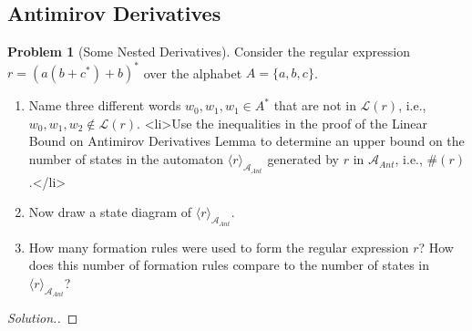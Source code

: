 \documentclass[11pt]{article}
\theoremstyle{theorem} %
\theoremstyle{definition} %
\newtheorem{problem}                    {{\color{BurntOrange}Problem}}
\theoremstyle{remark} %
\begin{document}
\subsection*{Antimirov Derivatives}

\begin{problem}
    [Some Nested Derivatives]
    Consider the regular expression \(r = (a(b+c^*) + b)^*\) over the alphabet \(A = \{a,b,c\}\).
    \begin{enumerate}
        \item Name three different words \(w_0,w_1,w_1 \in A^*\) that are not in \(\mathcal L(r)\), i.e., \(w_0,w_1,w_2 \notin \mathcal L(r)\).
        <li>Use the inequalities in the proof of the Linear Bound on Antimirov Derivatives Lemma to determine an upper bound on the number of states in the automaton \(\langle r\rangle_{\mathcal A_{Ant}}\) generated by \(r\) in \(\mathcal A_{Ant}\), i.e., \(\#(r)\).</li>
        \item Now draw a state diagram of \(\langle r\rangle_{\mathcal A_{Ant}}\).
        \item How many formation rules were used to form the regular expression \(r\)? 
            How does this number of formation rules compare to the number of states in \(\langle r\rangle_{\mathcal A_{Ant}}\)?
    \end{enumerate}
\end{problem}

\begin{proof}[Solution.]
    
\end{proof}
\end{document}
